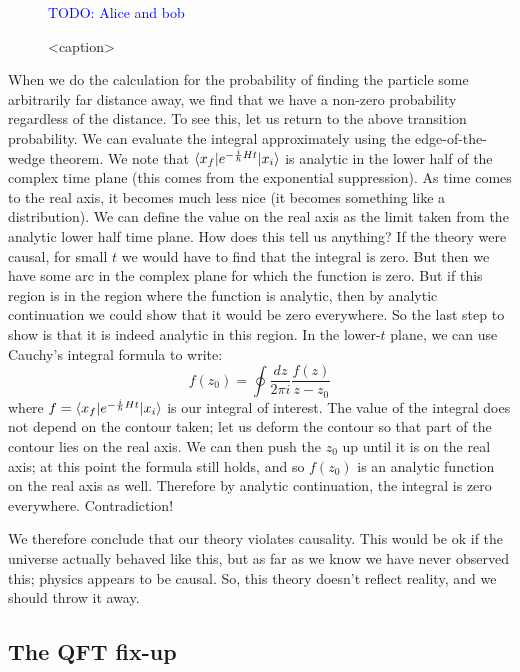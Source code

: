 \begin{figure}[htbp]
    \centering
    \textcolor{blue}{TODO: Alice and bob}
    \caption{<caption>}
    \label{<label>}
\end{figure}
When we do the calculation for the probability of finding the particle some arbitrarily far distance away, we find that we have a non-zero probability regardless of the distance. To see this, let us return to the above transition probability. We can evaluate the integral approximately using the edge-of-the-wedge theorem. We note that $\langle x_f \rvert e^{-\frac{i}{\hbar}Ht}\lvert x_i \rangle$ is analytic in the lower half of the complex time plane (this comes from the exponential suppression). As time comes to the real axis, it becomes much less nice (it becomes something like a distribution). We can define the value on the real axis as the limit taken from the analytic lower half time plane. How does this tell us anything? If the theory were causal, for small $t$ we would have to find that the integral is zero. But then we have some arc in the complex plane for which the function is zero. But if this region is in the region where the function is analytic, then by analytic continuation we could show that it would be zero everywhere. So the last step to show is that it is indeed analytic in this region. In the lower-$t$ plane, we can use Cauchy's integral formula to write:
\begin{equation}
    f(z_0) = \oint \frac{dz}{2\pi i}\frac{f(z)}{z - z_0}
\end{equation}
where $f = \langle x_f \rvert e^{-\frac{i}{\hbar}Ht}\lvert x_i \rangle$ is our integral of interest. The value of the integral does not depend on the contour taken; let us deform the contour so that part of the contour lies on the real axis. We can then push the $z_0$ up until it is on the real axis; at this point the formula still holds, and so $f(z_0)$ is an analytic function on the real axis as well. Therefore by analytic continuation, the integral is zero everywhere. Contradiction!

We therefore conclude that our theory violates causality. This would be ok if the universe actually behaved like this, but as far as we know we have never observed this; physics appears to be causal. So, this theory doesn't reflect reality, and we should throw it away.

\subsection{The QFT fix-up}

